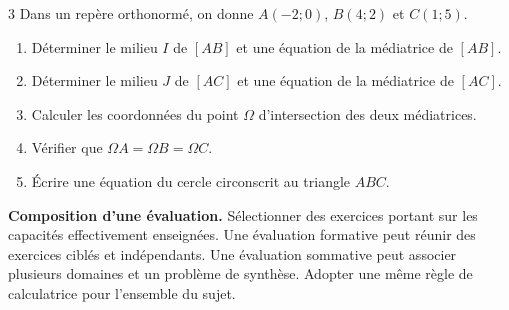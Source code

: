 \begin{probleme}{3}
Dans un repère orthonormé, on donne $A(-2;0)$, $B(4;2)$ et $C(1;5)$.
\begin{enumerate}
  \item Déterminer le milieu $I$ de $[AB]$ et une équation de la médiatrice
  de $[AB]$.
  \item Déterminer le milieu $J$ de $[AC]$ et une équation de la médiatrice
  de $[AC]$.
  \item Calculer les coordonnées du point $\Omega$ d'intersection des deux
  médiatrices.
  \item Vérifier que $\Omega A=\Omega B=\Omega C$.
  \item Écrire une équation du cercle circonscrit au triangle $ABC$.
\end{enumerate}
\end{probleme}

\begin{tcolorbox}[enhanced,breakable,frame hidden,
  borderline west={2pt}{0pt}{VE},colback=VE!3,sharp corners,
  left=12pt,right=10pt,top=7pt,bottom=7pt]
\textbf{Composition d'une évaluation.} Sélectionner des exercices portant sur
les capacités effectivement enseignées. Une évaluation formative peut réunir
des exercices ciblés et indépendants. Une évaluation sommative peut associer
plusieurs domaines et un problème de synthèse. Adopter une même règle de
calculatrice pour l'ensemble du sujet.
\end{tcolorbox}

